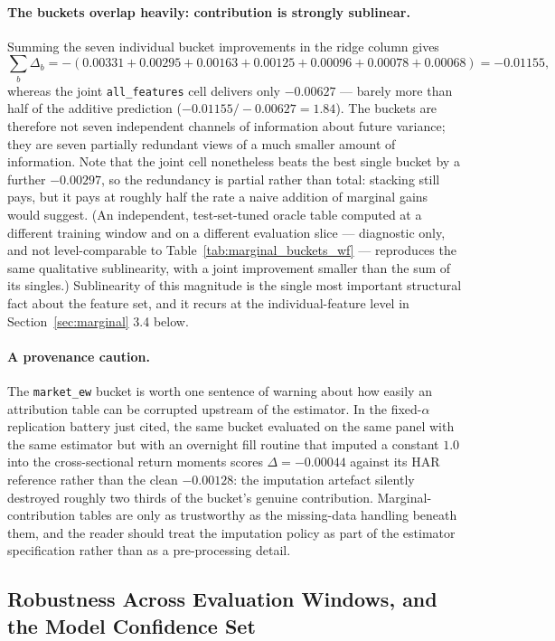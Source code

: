 \paragraph{The buckets overlap heavily: contribution is strongly sublinear.} Summing the
seven individual bucket improvements in the ridge column gives
\[
\textstyle\sum_b \Delta_b
= -(0.00331 + 0.00295 + 0.00163 + 0.00125 + 0.00096 + 0.00078 + 0.00068)
= -0.01155 ,
\]
whereas the joint \texttt{all\_features} cell delivers only $-0.00627$ --- barely more
than half of the additive prediction ($-0.01155 / -0.00627 = 1.84$). The buckets are
therefore not seven independent channels of information about future variance; they are
seven partially redundant views of a much smaller amount of information. Note that the
joint cell nonetheless beats the best single bucket by a further $-0.00297$, so the
redundancy is partial rather than total: stacking still pays, but it pays at roughly half
the rate a naive addition of marginal gains would suggest. (An independent, test-set-tuned
oracle table computed at a different training window and on a different evaluation slice
--- diagnostic only, and not level-comparable to Table~\ref{tab:marginal_buckets_wf} ---
reproduces the same qualitative sublinearity, with a joint improvement smaller than the sum
of its singles.) Sublinearity of this magnitude is the single most important structural
fact about the feature set, and it recurs at the individual-feature level in
Section~\ref{sec:marginal} 3.4 below.

\paragraph{A provenance caution.} The \texttt{market\_ew} bucket is worth one sentence of
warning about how easily an attribution table can be corrupted upstream of the estimator.
In the fixed-$\alpha$ replication battery just cited, the same bucket evaluated on the
same panel with the same estimator but with an overnight fill routine that imputed a
constant $1.0$ into the cross-sectional return moments scores $\Delta = -0.00044$ against
its HAR reference rather than the clean $-0.00128$: the imputation artefact silently
destroyed roughly two thirds of the bucket's genuine contribution. Marginal-contribution
tables are only as trustworthy as the missing-data handling beneath them, and the reader
should treat the imputation policy as part of the estimator specification rather than as
a pre-processing detail.

\subsection{Robustness Across Evaluation Windows, and the Model Confidence Set}

